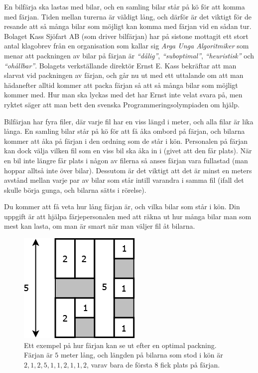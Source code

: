En bilfärja ska lastas med bilar, och en samling bilar står på kö för att komma med färjan. Tiden mellan turerna är väldigt lång, och därför är det viktigt för de resande att så många bilar som möjligt kan komma med färjan vid en sådan tur. Bolaget Kass Sjöfart AB (som driver bilfärjan) har på sistone mottagit ett stort antal klagobrev från en organisation som kallar sig \emph{Arga Unga Algoritmiker} som menar att packningen av bilar på färjan är \emph{``dålig''}, \emph{``suboptimal''}, \emph{``heuristisk''} och \emph{``ohållbar''}. Bolagets verkställande direktör Ernst E. Kass bekräftar att man slarvat vid packningen av färjan, och går nu ut med ett uttalande om att man hädanefter alltid kommer att packa färjan så att så många bilar som möjligt kommer med. Hur man ska lyckas med det har Ernst inte velat svara på, men ryktet säger att man bett den svenska Programmeringsolympiaden om hjälp.

Bilfärjan har fyra filer, där varje fil har en viss längd i meter, och alla filar är lika långa. En samling bilar står på kö för att få åka ombord på färjan, och bilarna kommer att åka på färjan i den ordning som de står i kön. Personalen på färjan kan dock välja vilken fil som en viss bil ska åka in i (givet att den får plats). När en bil inte längre får plats i någon av filerna så anses färjan vara fullastad (man hoppar alltså inte över bilar). Dessutom är det viktigt att det är minst en meters avstånd mellan varje par av bilar som står intill varandra i samma fil (ifall det skulle börja gunga, och bilarna sätts i rörelse).

Du kommer att få veta hur lång färjan är, och vilka bilar som står i kön. Din uppgift är att hjälpa färjepersonalen med att räkna ut hur många bilar man som mest kan lasta, om man är smart när man väljer fil åt bilarna.

\begin{figure}[!h]
\begin{center}
\includegraphics[scale=0.5]{farjan}
\end{center}
\caption{Ett exempel på hur färjan kan se ut efter en optimal packning. Färjan är $5$ meter lång, och längden på bilarna som stod i kön är $2, 1, 2, 5, 1, 1, 2, 1, 1, 2$, varav bara de första $8$ fick plats på färjan.}
\label{fig1}
\end{figure}

